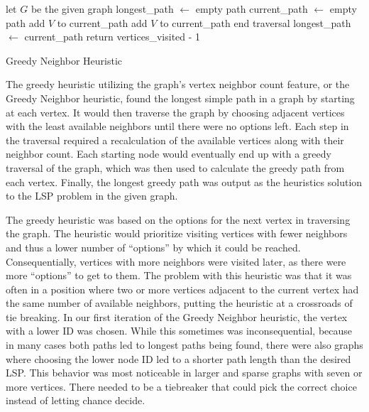 \documentclass[twocolumn,showpacs,%
  nofootinbib,aps,superscriptaddress,%
  eqsecnum,prd,notitlepage,showkeys,11pt]{article}
\begin{document}
\begin{algorithm*}
\begin{algorithmic}

\State let $G$ be the given graph
\State longest\_path $\gets$ empty path
    \State current\_path $\gets$ empty path
            \State add $V$ to current\_path
            \State add $V$ to current\_path
        \Else
            \State end traversal
        \EndIf
    \EndWhile
        \State longest\_path $\gets$ current\_path
    \EndIf
\EndFor
\State return vertices\_visited - 1

\end{algorithmic}
\caption{Greedy Neighbor Heuristic}\label{alg:GreedyNeighbor}
\end{algorithm*}

The greedy heuristic utilizing the graph's vertex neighbor count feature, or the Greedy Neighbor heuristic, found the longest simple path in a graph by starting at each vertex. It would then traverse the graph by choosing adjacent vertices with the least available neighbors until there were no options left. Each step in the traversal required a recalculation of the available vertices along with their neighbor count. Each starting node would eventually end up with a greedy traversal of the graph, which was then used to calculate the greedy path from each vertex. Finally, the longest greedy path was output as the heuristics solution to the LSP problem in the given graph.

The greedy heuristic was based on the options for the next vertex in traversing the graph. The heuristic would prioritize visiting vertices with fewer neighbors and thus a lower number of ``options'' by which it could be reached. Consequentially, vertices with more neighbors were visited later, as there were more ``options'' to get to them. The problem with this heuristic was that it was often in a position where two or more vertices adjacent to the current vertex had the same number of available neighbors, putting the heuristic at a crossroads of tie breaking. In our first iteration of the Greedy Neighbor heuristic, the vertex with a lower ID was chosen. While this sometimes was inconsequential, because in many cases both paths led to longest paths being found, there were also graphs where choosing the lower node ID led to a shorter path length than the desired LSP. This behavior was most noticeable in larger and sparse graphs with seven or more vertices. There needed to be a tiebreaker that could pick the correct choice instead of letting chance decide. 
\end{document}
